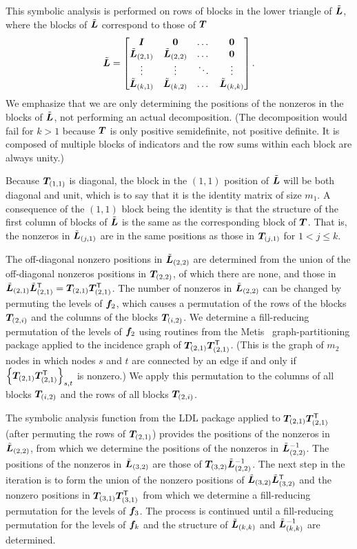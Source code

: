 \documentclass[12pt]{article}
\begin{document}
This symbolic analysis is performed on rows of blocks in the lower
triangle of $\tilde{\bm{L}}$, where the blocks of $\tilde{\bm{L}}$ correspond to those
of $\bm{T}$
\begin{equation}
  \label{eq:blockwiseL}
  \tilde{\bm{L}}=\begin{bmatrix}
    \bm{I}&\bm{0}&\dots&\bm{0}\\
    \tilde{\bm{L}}_{(2,1)}&\tilde{\bm{L}}_{(2,2)}&\dots&\bm{0}\\
    \vdots&\vdots&\ddots&\vdots\\
    \tilde{\bm{L}}_{(k,1)}&\tilde{\bm{L}}_{(k,2)}&\dots&\tilde{\bm{L}}_{(k,k)}
  \end{bmatrix} .
\end{equation}
We emphasize that we are only determining the positions of the
nonzeros in the blocks of $\tilde{\bm{L}}$, not performing an actual
decomposition.  (The decomposition would fail for $k>1$ because $\bm{T}$
is only positive semidefinite, not positive definite.  It is composed
of multiple blocks of indicators and the row sums within each block
are always unity.)

Because $\bm{T}_{(1,1)}$ is diagonal, the block in the $(1,1)$ position
of $\tilde{\bm{L}}$ will be both diagonal and unit, which is to say that it is
the identity matrix of size $m_1$.  A consequence of the $(1,1)$ block
being the identity is that the structure of the first column of blocks
of $\tilde{\bm{L}}$ is the same as the corresponding block of $\bm{T}$.  That is,
the nonzeros in $\tilde{\bm{L}}_{(j,1)}$ are in the same positions as those in
$\bm{T}_{(j,1)}$ for $1<j\le k$.

The off-diagonal nonzero positions in $\tilde{\bm{L}}_{(2,2)}$ are determined
from the union of the off-diagonal nonzeros positions in
$\bm{T}_{(2,2)}$, of which there are none, and those in
$\tilde{\bm{L}}_{(2,1)}\tilde{\bm{L}}_{(2,1)}^\mathsf{T}=\bm{T}_{(2,1)}\bm{T}_{(2,1)}^\mathsf{T}$.  The
number of nonzeros in $\tilde{\bm{L}}_{(2,2)}$ can be changed by permuting the
levels of $\bm{f}_2$, which causes a permutation of the rows of the
blocks $\bm{T}_{(2,i)}$ and the columns of the blocks $\bm{T}_{(i,2)}$.  We
determine a fill-reducing permutation of the levels of $\bm{f}_2$ using
routines from the Metis~\citep{Metis} graph-partitioning package
applied to the incidence graph of $\bm{T}_{(2,1)}\bm{T}_{(2,1)}^\mathsf{T}$.
(This is the graph of $m_2$ nodes in which nodes $s$ and $t$ are
connected by an edge if and only if
$\left\{\bm{T}_{(2,1)}\bm{T}_{(2,1)}^\mathsf{T}\right\}_{s,t}$ is nonzero.)  We
apply this permutation to the columns of all blocks $\bm{T}_{(i,2)}$ and
the rows of all blocks $\bm{T}_{(2,i)}$.

The symbolic analysis function from the LDL package applied to
$\bm{T}_{(2,1)}\bm{T}_{(2,1)}^\mathsf{T}$ (after permuting the rows of
$\bm{T}_{(2,1)}$) provides the positions of the nonzeros in
$\tilde{\bm{L}}_{(2,2)}$, from which we determine the positions of the nonzeros
in $\tilde{\bm{L}}_{(2,2)}^{-1}$.  The positions of the nonzeros in $\tilde{\bm{L}}_{(3,2)}$
are those of $\bm{T}_{(3,2)}\tilde{\bm{L}}_{(2,2)}^{-1}$.  The next step in the
iteration is to form the union of the nonzero positions of
$\tilde{\bm{L}}_{(3,2)}\tilde{\bm{L}}_{(3,2)}^\mathsf{T}$ and the nonzero positions in
$\bm{T}_{(3,1)}\bm{T}_{(3,1)}^\mathsf{T}$ from which we determine a fill-reducing
permutation for the levels of $\bm{f}_3$.  The process is continued
until a fill-reducing permutation for the levels of $\bm{f}_k$ and the
structure of $\tilde{\bm{L}}_{(k,k)}$ and $\tilde{\bm{L}}_{(k,k)}^{-1}$ are determined.
\end{document}
